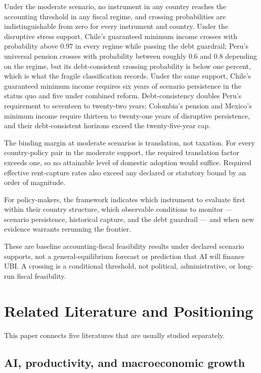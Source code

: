 \documentclass[11pt,a4paper]{article}
\begin{document}
Under the moderate scenario, no instrument in any country reaches the accounting threshold in any fiscal regime, and crossing probabilities are indistinguishable from zero for every instrument and country. Under the disruptive stress support, Chile's guaranteed minimum income crosses with probability above $0.97$ in every regime while passing the debt guardrail; Peru's universal pension crosses with probability between roughly $0.6$ and $0.8$ depending on the regime, but its debt-consistent crossing probability is below one percent, which is what the fragile classification records. Under the same support, Chile's guaranteed minimum income requires six years of scenario persistence in the status quo and five under combined reform. Debt-consistency doubles Peru's requirement to seventeen to twenty-two years; Colombia's pension and Mexico's minimum income require thirteen to twenty-one years of disruptive persistence, and their debt-consistent horizons exceed the twenty-five-year cap.

The binding margin at moderate scenarios is translation, not taxation. For every country-policy pair in the moderate support, the required translation factor exceeds one, so no attainable level of domestic adoption would suffice. Required effective rent-capture rates also exceed any declared or statutory bound by an order of magnitude.

For policy-makers, the framework indicates which instrument to evaluate first within their country structure, which observable conditions to monitor --- scenario persistence, historical capture, and the debt guardrail --- and when new evidence warrants rerunning the frontier.

These are baseline accounting-fiscal feasibility results under declared scenario supports, not a general-equilibrium forecast or prediction that AI will finance UBI. A crossing is a conditional threshold, not political, administrative, or long-run fiscal feasibility.

\section{Related Literature and Positioning}\label{sec:literature}

This paper connects five literatures that are usually studied separately.

\subsection{AI, productivity, and macroeconomic growth}
\end{document}
